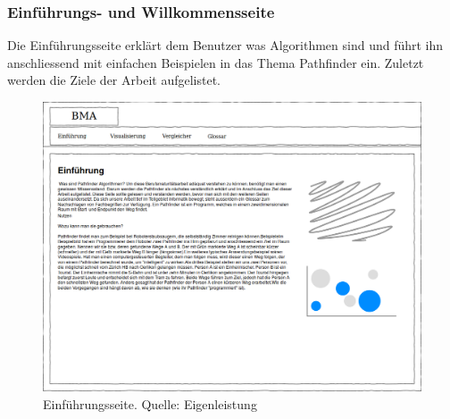 \documentclass[12pt,a4paper,german]{report}
\begin{document}
\subsubsection{Einführungs- und Willkommensseite}
Die Einführungsseite erklärt dem Benutzer was Algorithmen sind und führt ihn anschliessend mit einfachen Beispielen in das Thema Pathfinder ein. Zuletzt werden die Ziele der Arbeit aufgelistet.
\begin{figure}[H]
  \centering
  \includegraphics[width=16cm]{einfuehrung1}
  \caption[Konzept der Einführungsseite.]{Einführungsseite. Quelle: Eigenleistung}
  \label{fig:einfuehrung1}
\end{figure}

\clearpage
\end{document}
